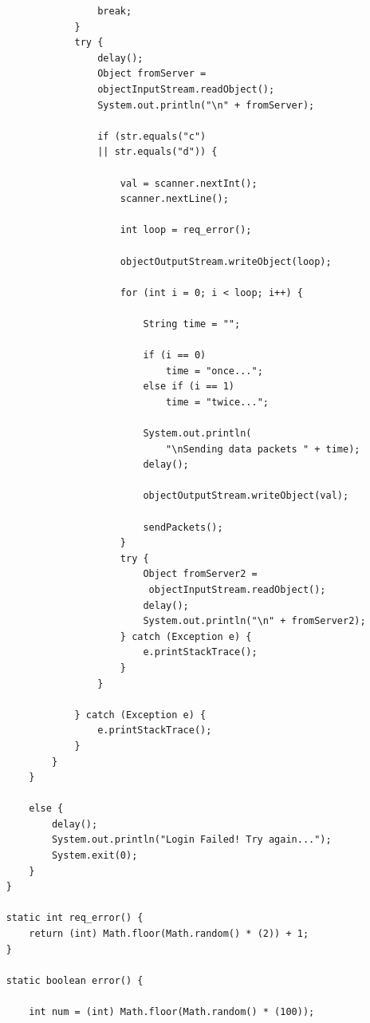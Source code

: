 \documentclass[11pt]{article}
\begin{document}
\begin{verbatim}
                    break;
                }
                try {
                    delay();
                    Object fromServer = 
                    objectInputStream.readObject();
                    System.out.println("\n" + fromServer);

                    if (str.equals("c") 
                    || str.equals("d")) {

                        val = scanner.nextInt();
                        scanner.nextLine();

                        int loop = req_error();

                        objectOutputStream.writeObject(loop);

                        for (int i = 0; i < loop; i++) {

                            String time = "";

                            if (i == 0)
                                time = "once...";
                            else if (i == 1)
                                time = "twice...";

                            System.out.println(
                                "\nSending data packets " + time);
                            delay();

                            objectOutputStream.writeObject(val);

                            sendPackets();
                        }
                        try {
                            Object fromServer2 =
                             objectInputStream.readObject();
                            delay();
                            System.out.println("\n" + fromServer2);
                        } catch (Exception e) {
                            e.printStackTrace();
                        }
                    }

                } catch (Exception e) {
                    e.printStackTrace();
                }
            }
        }

        else {
            delay();
            System.out.println("Login Failed! Try again...");
            System.exit(0);
        }
    }

    static int req_error() {
        return (int) Math.floor(Math.random() * (2)) + 1;
    }

    static boolean error() {

        int num = (int) Math.floor(Math.random() * (100));


\end{verbatim}
\end{document}

